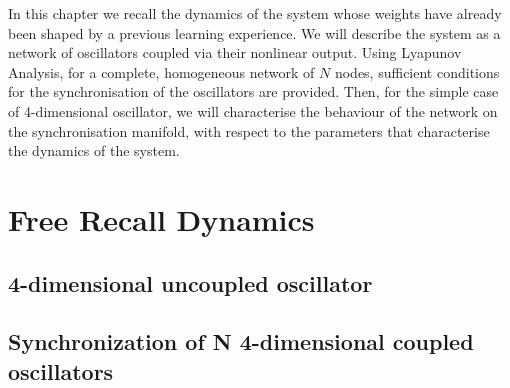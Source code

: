 In this chapter we recall the dynamics of the system whose weights have already been shaped by a previous learning experience. We will describe the system as a network of oscillators coupled via their nonlinear output. 
Using Lyapunov Analysis, for a complete, homogeneous network of $N$ nodes, sufficient conditions for the synchronisation of the oscillators are provided. Then, for the simple case of 4-dimensional oscillator, we will characterise the behaviour of  the network on the synchronisation manifold, with respect to the parameters that characterise the dynamics of the system. 

\section{Free Recall Dynamics}

\iffalse
\subsection{2by2 system without adaptation}

\fi
\subsection{4-dimensional uncoupled oscillator}
%

\subsection{Synchronization of N 4-dimensional coupled oscillators}
